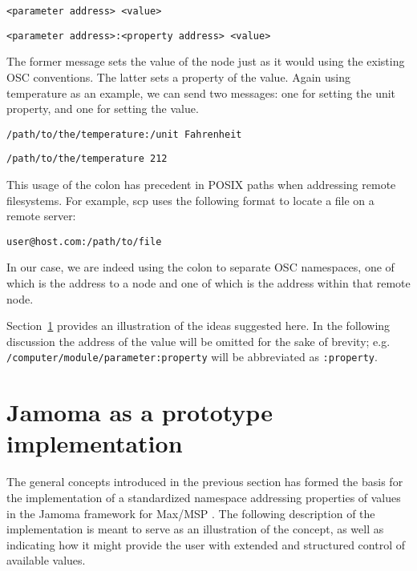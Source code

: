 \documentclass{sig-alternate}
\begin{document}
\texttt{<parameter address> <value>}

\texttt{<parameter address>:<property address> <value>}

The former message sets the value of the node just as it would using the existing OSC conventions. The latter sets a property of the value.  Again using temperature as an example, we can send two messages: one for setting the unit property, and one for setting the value.

\texttt{/path/to/the/temperature:/unit Fahrenheit}

\texttt{/path/to/the/temperature 212}

This usage of the colon has precedent in POSIX paths when addressing remote filesystems.  For example, scp uses the following format to locate a file on a remote server:

\texttt{user@host.com:/path/to/file}

In our case, we are indeed using the colon to separate OSC namespaces, one of which is the address to a node and one of which is the address within that remote node.

Section~\ref{sec:prototype_implementation} provides an illustration of the ideas suggested here. In the following discussion the address of the value will be omitted for the sake of brevity; e.g.\\ 
\texttt{/computer/module/parameter:property}  
will be abbreviated as \texttt{:property}.







\section{Jamoma as a prototype implementation} %
\label{sec:prototype_implementation}

The general concepts introduced in the previous section has formed the basis for the implementation of a standardized namespace addressing properties of values in the Jamoma framework for Max/MSP \cite{Place:2006}. The following description of the implementation is meant to serve as an illustration of the concept, as well as indicating how it might provide the user with extended and structured control of available values.
\end{document}
